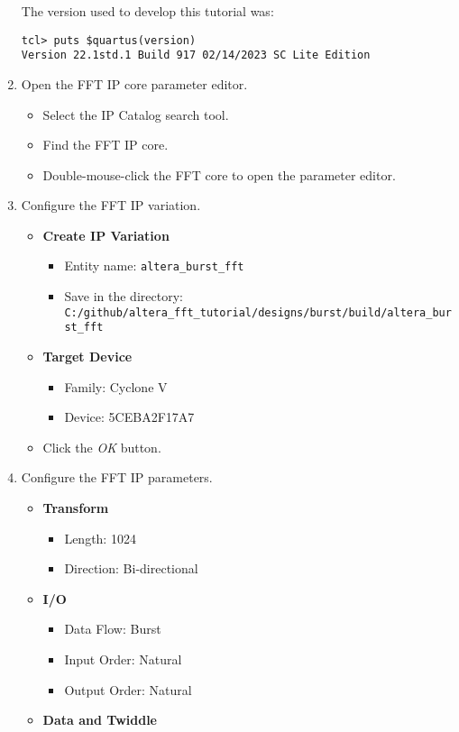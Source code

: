 \begin{enumerate}
The version used to develop this tutorial was:
\begin{verbatim}
tcl> puts $quartus(version)
Version 22.1std.1 Build 917 02/14/2023 SC Lite Edition
\end{verbatim}
\item Open the FFT IP core parameter editor.
%
\begin{itemize}
\item Select the IP Catalog search tool.
\item Find the FFT IP core.
\item Double-mouse-click the FFT core to open the parameter editor.
\end{itemize}
%
\item Configure the FFT IP variation.
%
\begin{itemize}
\item \textbf{Create IP Variation}
\begin{itemize}
\item Entity name: \texttt{altera\_burst\_fft}
\item Save in the directory:\\
\texttt{C:/github/altera\_fft\_tutorial/designs/burst/build/altera\_burst\_fft}
\end{itemize}
%
\item \textbf{Target Device}
\begin{itemize}
\item Family: Cyclone V
\item Device: 5CEBA2F17A7
\end{itemize}
\item Click the \emph{OK} button.
\end{itemize}
%
\item Configure the FFT IP parameters.
%
\begin{itemize}
\item \textbf{Transform}
\begin{itemize}
\item Length: 1024
\item Direction: Bi-directional
\end{itemize}
%
\item \textbf{I/O}
\begin{itemize}
\item Data Flow: Burst
\item Input Order: Natural
\item Output Order: Natural
\end{itemize}
%
\item \textbf{Data and Twiddle}

\end{itemize}
\end{enumerate}
